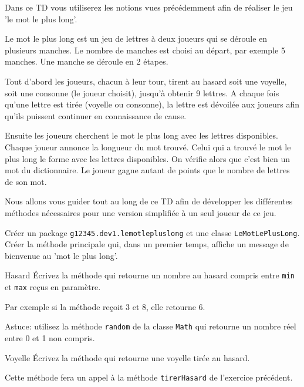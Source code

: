 \documentclass[a4paper,11pt]{article}
\date{2018 -- 2019}
\begin{document}
\entete
\titre
{}
\lastedit

\vspace{0.5cm}

	Dans ce TD vous utiliserez les notions vues précédemment afin de réaliser 
	le jeu 'le mot le plus long'. 
	
	Le mot le plus long est un jeu de lettres à deux joueurs qui se déroule en
	plusieurs manches. Le nombre de manches est choisi au départ, par exemple 5 manches.
	Une manche se déroule en 2 étapes. 
	
	Tout d'abord les joueurs, chacun à leur tour, 
	tirent au hasard soit une voyelle, soit une consonne (le joueur choisit), 
	jusqu'à obtenir 9 lettres. A chaque fois qu'une lettre est tirée 
	(voyelle ou consonne), la lettre est dévoilée aux joueurs afin qu'ils puissent
	continuer en connaissance de cause.

	Ensuite les joueurs cherchent le mot le plus long avec les lettres disponibles.
	Chaque joueur annonce la longueur du mot trouvé. Celui qui a trouvé le mot le 
	plus long le forme avec les lettres disponibles. On vérifie alors que c'est 
	bien un mot du dictionnaire. Le joueur gagne autant de points que le nombre
	de lettres de son mot. 
			

\vspace{0.5cm}


Nous allons vous guider tout au long de ce TD afin de développer les différentes méthodes nécessaires pour une version simplifiée à un seul joueur de ce jeu.



		Créer un package \texttt{g12345.dev1.lemotlepluslong} et une classe
		 \texttt{LeMotLePlusLong}. Créer la méthode principale qui, dans un premier 
		temps, affiche un message de bienvenue au 'mot le plus long'.


 	\begin{Exercice}{Hasard}
		\'Ecrivez la méthode  qui
		retourne un nombre au hasard compris entre \texttt{min} et
		\texttt{max} reçus en paramètre.
		
		Par exemple si la méthode reçoit 3 et 8, elle retourne 6.
		
		Astuce: utilisez la méthode \texttt{random} de la classe \texttt{Math} qui 
		retourne un nombre réel entre 0 et 1 non compris.
	\end{Exercice} 

 
 	\begin{Exercice}{Voyelle}
		\'Ecrivez la méthode  qui retourne une voyelle 
		tirée au hasard.
		
		Cette méthode fera un appel à la méthode \texttt{tirerHasard} 
		de l'exercice précédent.
	\end{Exercice} 
\end{document}
